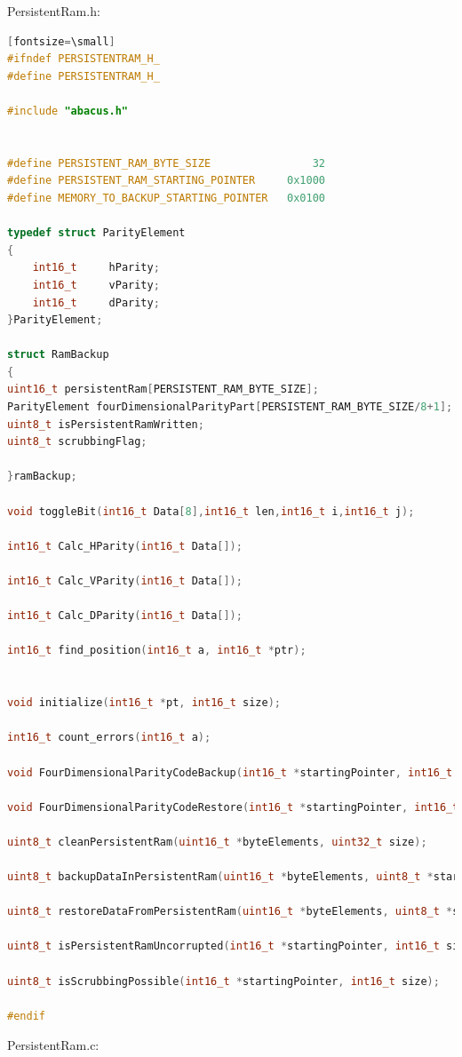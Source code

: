 \documentclass[LaM,binding=0.6cm]{../sapthesis}
\begin{document}
PersistentRam.h:
\begin{lstlisting}[language=c][fontsize=\small]
#ifndef PERSISTENTRAM_H_
#define PERSISTENTRAM_H_

#include "abacus.h"


#define PERSISTENT_RAM_BYTE_SIZE                32
#define PERSISTENT_RAM_STARTING_POINTER     0x1000
#define MEMORY_TO_BACKUP_STARTING_POINTER   0x0100

typedef struct ParityElement
{
    int16_t     hParity;
    int16_t     vParity;
    int16_t     dParity;
}ParityElement;

struct RamBackup
{
uint16_t persistentRam[PERSISTENT_RAM_BYTE_SIZE];
ParityElement fourDimensionalParityPart[PERSISTENT_RAM_BYTE_SIZE/8+1];
uint8_t isPersistentRamWritten;
uint8_t scrubbingFlag;

}ramBackup;

void toggleBit(int16_t Data[8],int16_t len,int16_t i,int16_t j);

int16_t Calc_HParity(int16_t Data[]);

int16_t Calc_VParity(int16_t Data[]);

int16_t Calc_DParity(int16_t Data[]);

int16_t find_position(int16_t a, int16_t *ptr);


void initialize(int16_t *pt, int16_t size);

int16_t count_errors(int16_t a);

void FourDimensionalParityCodeBackup(int16_t *startingPointer, int16_t size);

void FourDimensionalParityCodeRestore(int16_t *startingPointer, int16_t size);

uint8_t cleanPersistentRam(uint16_t *byteElements, uint32_t size);

uint8_t backupDataInPersistentRam(uint16_t *byteElements, uint8_t *startingPointer, uint32_t size);

uint8_t restoreDataFromPersistentRam(uint16_t *byteElements, uint8_t *startingPointer, uint32_t size);

uint8_t isPersistentRamUncorrupted(int16_t *startingPointer, int16_t size);

uint8_t isScrubbingPossible(int16_t *startingPointer, int16_t size);

#endif
\end{lstlisting}

PersistentRam.c:
\end{document}
